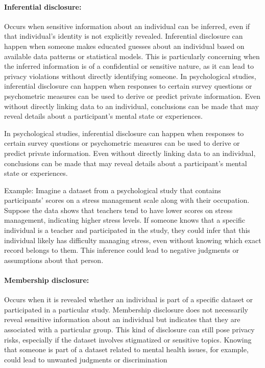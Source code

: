 \documentclass{article}
\begin{document}
\paragraph{Inferential disclosure:}
Occurs when sensitive information about an individual can be inferred, even if that individual’s identity is not explicitly revealed. Inferential disclosure can happen when someone makes educated guesses about an individual based on available data patterns or statistical models. This is particularly concerning when the inferred information is of a confidential or sensitive nature, as it can lead to privacy violations without directly identifying someone.
In psychological studies, inferential disclosure can happen when responses to certain survey questions or psychometric measures can be used to derive or predict private information. Even without directly linking data to an individual, conclusions can be made that may reveal details about a participant’s mental state or experiences.

In psychological studies, inferential disclosure can happen when responses to certain survey questions or psychometric measures can be used to derive or predict private information. Even without directly linking data to an individual, conclusions can be made that may reveal details about a participant’s mental state or experiences.

Example:
Imagine a dataset from a psychological study that contains participants' scores on a stress management scale along with their occupation. Suppose the data shows that teachers tend to have lower scores on stress management, indicating higher stress levels. If someone knows that a specific individual is a teacher and participated in the study, they could infer that this individual likely has difficulty managing stress, even without knowing which exact record belongs to them. This inference could lead to negative judgments or assumptions about that person.

\paragraph{Membership disclosure:}
Occurs when it is revealed whether an individual is part of a specific dataset or participated in a particular study. Membership disclosure does not necessarily reveal sensitive information about an individual but indicates that they are associated with a particular group. This kind of disclosure can still pose privacy risks, especially if the dataset involves stigmatized or sensitive topics. Knowing that someone is part of a dataset related to mental health issues, for example, could lead to unwanted judgments or discrimination
\end{document}
